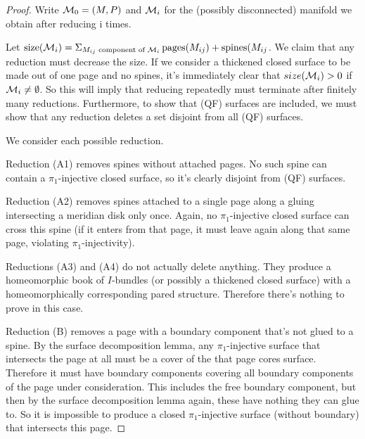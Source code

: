 \begin{proof}

Write $\mathcal{M}_0 = (M,P)$ and $\mathcal{M}_i$ for the (possibly disconnected) manifold we
obtain after reducing i times.

Let $\operatorname{size}(\mathcal{M}_i) = \Sigma_{M_{ij} \text{ component of } \mathcal{M}_i}
\operatorname{pages}(M_{ij}) + \operatorname{spines}(M_{ij}$. We claim that any
reduction must decrease the size. If we consider a thickened closed surface to
be made out of one page and no spines, it's immediately clear that
$size(\mathcal{M}_i)>0$ if $\mathcal{M}_i \neq \emptyset$.  So this will imply that reducing
repeatedly must terminate after finitely many reductions. Furthermore, to show
that (QF) surfaces are included, we must show that any reduction deletes a set
disjoint from all (QF) surfaces.

We consider each possible reduction.

Reduction (A1) removes spines without attached pages. No such spine can contain
a $\pi_1$-injective closed surface, so it's clearly disjoint from (QF) surfaces.

Reduction (A2) removes spines attached to a single page along a gluing
intersecting a meridian disk only once. Again, no $\pi_1$-injective closed surface
can cross this spine (if it enters from that page, it must leave again along
that same page, violating $\pi_1$-injectivity).


Reductions (A3) and (A4) do not actually delete anything. They produce
a homeomorphic book of $I$-bundles (or possibly a thickened closed surface)
with a homeomorphically corresponding pared structure. Therefore there's
nothing to prove in this case.

Reduction (B) removes a page with a boundary component that's not glued to
a spine. By the surface decomposition lemma, any $\pi_1$-injective surface that
intersects the page at all must be a cover of the that page cores surface.
Therefore it must have boundary components covering all boundary components of
the page under consideration. This includes the free boundary component, but
then by the surface decomposition lemma again, these have nothing they can glue
to. So it is impossible to produce a closed $\pi_1$-injective surface (without
boundary) that intersects this page.


\end{proof}
